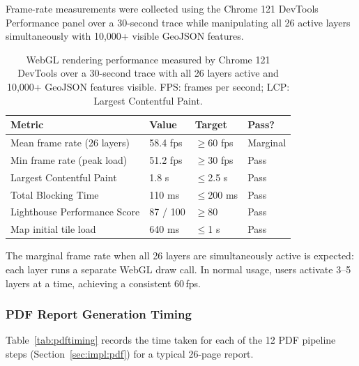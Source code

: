 \documentclass[12pt,a4paper]{article}
\begin{document}
Frame-rate measurements were collected using the Chrome 121 DevTools
Performance panel over a 30-second trace while manipulating all 26 active
layers simultaneously with 10,000+ visible GeoJSON features.

\begin{table}[H]
\centering
\caption[Frontend rendering performance]{%
WebGL rendering performance measured by Chrome 121 DevTools over a
30-second trace with all 26 layers active and 10,000+ GeoJSON features
visible. FPS: frames per second; LCP: Largest Contentful Paint.}
\label{tab:frontend}
\begin{tabularx}{\textwidth}{@{}lXXX@{}}
\toprule
\textbf{Metric} & \textbf{Value} & \textbf{Target} & \textbf{Pass?} \\
\midrule
Mean frame rate (26 layers)  & 58.4 fps & $\geq$60 fps & Marginal \\
Min frame rate (peak load)   & 51.2 fps & $\geq$30 fps & Pass \\
Largest Contentful Paint     & 1.8 s    & $\leq$2.5 s  & Pass \\
Total Blocking Time          & 110 ms   & $\leq$200 ms & Pass \\
Lighthouse Performance Score & 87 / 100 & $\geq$80     & Pass \\
Map initial tile load        & 640 ms   & $\leq$1 s    & Pass \\
\bottomrule
\end{tabularx}
\end{table}

The marginal frame rate when all 26 layers are simultaneously active is
expected: each layer runs a separate WebGL draw call. In normal usage,
users activate 3--5 layers at a time, achieving a consistent 60\,fps.

\subsubsection{PDF Report Generation Timing}

Table~\ref{tab:pdftiming} records the time taken for each of the 12 PDF
pipeline steps (Section~\ref{sec:impl:pdf}) for a typical 26-page report.
\end{document}
